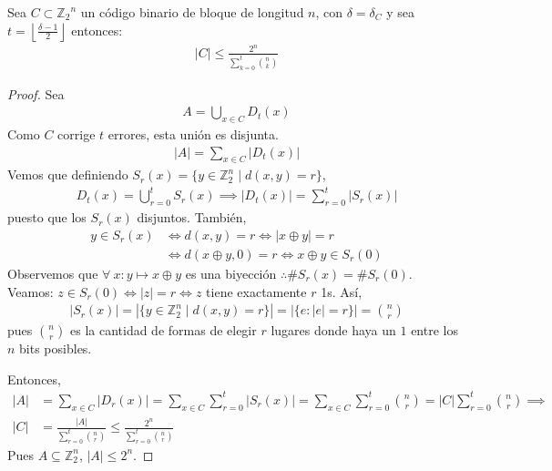 \begin{theorem}
Sea $C \subset {\mathbb{Z}_2}^n$ un código binario de bloque de longitud $n$, con $\delta = \delta_C$ y sea $t = \left\lfloor{\frac{\delta - 1}{2}} \right\rfloor$ entonces:
\begin{align}
\left| C \right| \le \frac{2^n}{\displaystyle \sum\limits_{k=0}^{t} \displaystyle\binom{n}{k}}
\end{align}
\end{theorem}

\begin{proof}
Sea \begin{align}
A = \bigcup_{x\in C} D_t(x)
\end{align}
Como $C$ corrige $t$ errores, esta unión es disjunta.
\begin{align}
\left|A\right| = \sum_{x\in C} \left|D_t(x)\right|
\end{align}
Vemos que definiendo $S_r(x) = \{y \in \mathbb{Z}_2^n \mid d(x,y) = r\}$,
\begin{align}
D_t(x) = \bigcup_{r=0}^t S_r(x) \implies \left|D_t(x)\right| = \sum_{r=0}^t \left|S_r(x)\right|
\end{align}
puesto que los $S_r(x)$ disjuntos. También,
\begin{align}
y \in S_r(x) &\iff d(x,y) = r \iff \left|x\oplus y\right| = r\\
    &\iff d(x\oplus y, 0) = r \iff x\oplus y \in S_r(0)
\end{align}
Observemos que $\forall~ x: y \mapsto x \oplus y $ es una biyección $\therefore\# S_r(x) = \# S_r(0)$.\\
Veamos: $z \in S_r(0) \iff |z| = r \iff z$ tiene exactamente $r$ 1s.
Así, 
\begin{align}
|S_r(x)| = \left| \{y \in \mathbb{Z}_2^n \mid d(x,y) = r\} \right| = \left|\{e : |e| = r\}\right| = {\binom{n}{r}}
\end{align}
pues $\binom{n}{r}$ es la cantidad de formas de elegir $r$ lugares donde haya un $1$ entre los $n$ bits posibles.

Entonces,
\begin{align}
\left|A\right| &= \sum_{x\in C} \left|D_r(x)\right| = \sum_{x\in C} \sum_{r=0}^t \left|S_r(x)\right|
= \sum_{x\in C}\sum_{r=0}^t {\binom{n}{r}}
= \left|C\right| \sum_{r=0}^t {\binom{n}{r}} 
\implies\\
\left|C\right| &= \frac{\left|A\right|}
{\sum\limits_{r=0}^t {\binom{n}{r}}} \le \frac{2^n}{\sum\limits_{r=0}^t {\binom{n}{r}}}
\end{align}
Pues $A\subseteq \mathbb{Z}_2^n$, $\left|A\right| \le 2^n$.
\end{proof}

